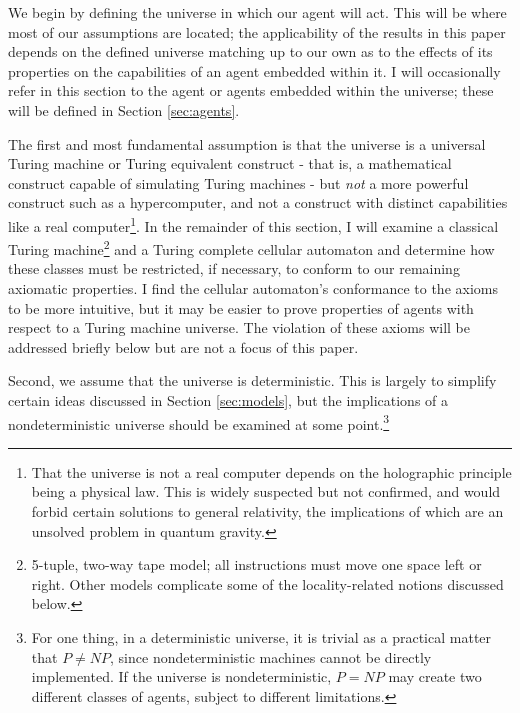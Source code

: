 \documentclass[12pt]{article}
\theoremstyle{definition}
\begin{document}
We begin by defining the universe in which our agent will act. This will be
where most of our assumptions are located; the applicability of the results in
this paper depends on the defined universe matching up to our own as to the
effects of its properties on the capabilities of an agent embedded within it. I
will occasionally refer in this section to the agent or agents embedded within
the universe; these will be defined in Section \ref{sec:agents}.

The first and most fundamental assumption is that the universe is a universal
Turing machine or Turing equivalent construct - that is, a mathematical
construct capable of simulating Turing machines - but \textit{not} a more
powerful construct such as a hypercomputer, and not a construct with distinct
capabilities like a real computer\footnote{That the universe is not a real
computer depends on the holographic principle being a physical law. This is
widely suspected but not confirmed, and would forbid certain solutions to
general relativity, the implications of which are an unsolved problem in quantum
gravity.}. In the remainder of this section, I will examine a classical Turing
machine\footnote{5-tuple, two-way tape model; all instructions must move one
space left or right. Other models complicate some of the locality-related
notions discussed below.} and a Turing complete cellular automaton and determine
how these classes must be restricted, if necessary, to conform to our remaining
axiomatic properties. I find the cellular automaton's conformance to the axioms
to be more intuitive\footnotemark, but it may be easier to prove properties of
agents with respect to a Turing machine universe. The violation of these axioms
will be addressed briefly below but are not a focus of this paper.


Second, we assume that the universe is deterministic. This is largely to
simplify certain ideas discussed in Section \ref{sec:models}, but the
implications of a nondeterministic universe should be examined at some
point.\footnote{For one thing, in a deterministic universe, it is trivial as a
practical matter that \(P \not= \mathit{NP}\), since nondeterministic machines
cannot be directly implemented. If the universe is nondeterministic, \(P =
\mathit{NP}\) may create two different classes of agents, subject to different
limitations.}%
\end{document}
